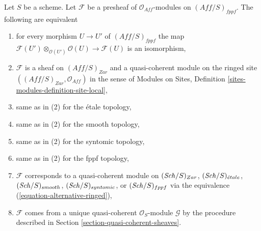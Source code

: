 \begin{lemma}
\label{lemma-quasi-coherent-alternative}
Let $S$ be a scheme. Let $\mathcal{F}$ be a presheaf
of $\mathcal{O}_{\textit{Aff}}$-modules on $(\textit{Aff}/S)_{fppf}$.
The following are equivalent
\begin{enumerate}
\item for every morphism $U \to U'$ of $(\textit{Aff}/S)_{fppf}$ the map
$\mathcal{F}(U') \otimes_{\mathcal{O}(U')} \mathcal{O}(U) \to \mathcal{F}(U)$
is an isomorphism,
\item $\mathcal{F}$ is a sheaf on $(\textit{Aff}/S)_{Zar}$ and
a quasi-coherent module on the ringed site
$((\textit{Aff}/S)_{Zar}, \mathcal{O}_{\textit{Aff}})$ in the sense of
Modules on Sites, Definition \ref{sites-modules-definition-site-local},
\item same as in (2) for the \'etale topology,
\item same as in (2) for the smooth topology,
\item same as in (2) for the syntomic topology,
\item same as in (2) for the fppf topology,
\item $\mathcal{F}$ corresponds to a quasi-coherent module on
$(\mathit{Sch}/S)_{Zar}$,
$(\mathit{Sch}/S)_{\acute{e}tale}$,
$(\mathit{Sch}/S)_{smooth}$,
$(\mathit{Sch}/S)_{syntomic}$, or
$(\mathit{Sch}/S)_{fppf}$
via the equivalence (\ref{equation-alternative-ringed}),
\item $\mathcal{F}$ comes from a unique quasi-coherent
$\mathcal{O}_S$-module $\mathcal{G}$ by the procedure
described in Section \ref{section-quasi-coherent-sheaves}.
\end{enumerate}
\end{lemma}

